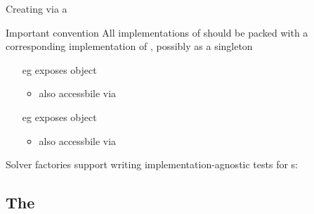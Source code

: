 \documentclass[handout]{beamer}
\begin{document}
\begin{frame}[allowframebreaks]{Creating  via a }
    \framebreak

    \begin{alertblock}{Important convention}\centering
        All implementations of  should be packed with a corresponding implementation of , possibly as a \alert{singleton}
    \end{alertblock}
    \begin{itemize}
        \item[eg]  exposes object 
        \begin{itemize}
            \item also accessbile via 
        \end{itemize}

        \item[eg]  exposes object 
        \begin{itemize}
            \item also accessbile via 
        \end{itemize}
    \end{itemize}

    \framebreak


    \framebreak

    Solver factories support writing \alert{implementation-agnostic} tests for s:

\end{frame}

\subsection{The }
\end{document}
